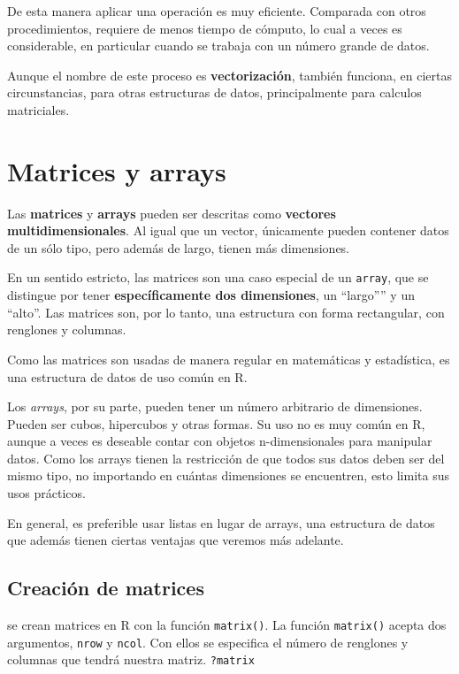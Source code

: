 \documentclass[
]{book}
\begin{document}
De esta manera aplicar una operación es muy eficiente. Comparada con otros procedimientos, requiere de menos tiempo de cómputo, lo cual a veces es considerable, en particular cuando se trabaja con un número grande de datos.

Aunque el nombre de este proceso es \textbf{vectorización}, también funciona, en ciertas circunstancias, para otras estructuras de datos, principalmente para calculos matriciales.

\hypertarget{matrices-y-arrays}{%
\section{Matrices y arrays}\label{matrices-y-arrays}}

Las \textbf{matrices} y \textbf{arrays} pueden ser descritas como \textbf{vectores multidimensionales}. Al igual que un vector, únicamente pueden contener datos de un sólo tipo, pero además de largo, tienen más dimensiones.

En un sentido estricto, las matrices son una caso especial de un \texttt{array}, que se distingue por tener \textbf{específicamente dos dimensiones}, un ``largo'''' y un ``alto''. Las matrices son, por lo tanto, una estructura con forma rectangular, con renglones y columnas.

Como las matrices son usadas de manera regular en matemáticas y estadística, es una estructura de datos de uso común en R.

Los \emph{arrays}, por su parte, pueden tener un número arbitrario de dimensiones. Pueden ser cubos, hipercubos y otras formas. Su uso no es muy común en R, aunque a veces es deseable contar con objetos n-dimensionales para manipular datos. Como los arrays tienen la restricción de que todos sus datos deben ser del mismo tipo, no importando en cuántas dimensiones se encuentren, esto limita sus usos prácticos.

En general, es preferible usar listas en lugar de arrays, una estructura de datos que además tienen ciertas ventajas que veremos más adelante.

\hypertarget{creaciuxf3n-de-matrices}{%
\subsection{Creación de matrices}\label{creaciuxf3n-de-matrices}}

se crean matrices en R con la función \texttt{matrix()}. La función \texttt{matrix()} acepta dos argumentos, \texttt{nrow} y \texttt{ncol}. Con ellos se especifica el número de renglones y columnas que tendrá nuestra matriz. \texttt{?matrix}
\end{document}
